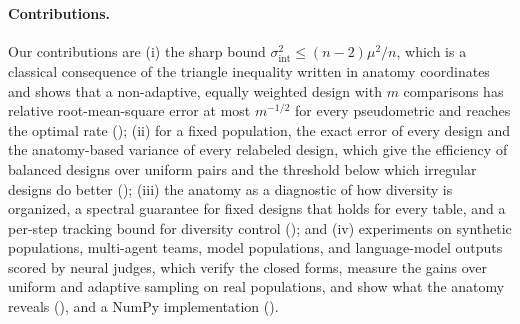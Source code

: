 \documentclass[twoside,11pt]{article}
\newcommand{\sigmaint}{\sigma^2_{\mathrm{int}}}
\begin{document}
\paragraph{Contributions.}
Our contributions are (i) the sharp bound ${\sigmaint\le(n-2)\mu^2/n}$,
which is a classical consequence of the triangle inequality written in
anatomy coordinates and shows that a non-adaptive, equally weighted design
with $m$ comparisons has relative root-mean-square error at most $m^{-1/2}$
for every pseudometric and reaches the optimal rate
();
(ii) for a fixed population, the exact error of every design and the anatomy-based variance of
every relabeled design, which give the efficiency of balanced designs
over uniform pairs and the threshold below which irregular designs do
better ();
(iii) the anatomy as a diagnostic of how diversity is organized, a
spectral guarantee for fixed designs that holds for every table, and a per-step tracking bound for
diversity control (); and
(iv) experiments on synthetic populations, multi-agent teams, model
populations, and language-model outputs scored by neural judges, which
verify the closed forms, measure the gains over uniform and adaptive
sampling on real populations, and show what the anatomy reveals
(), and a NumPy implementation
().
\end{document}
